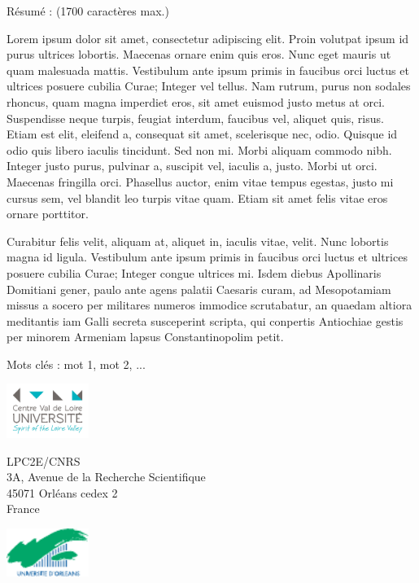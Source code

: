 {\begin{framed}
	\begin{minipage}{\dimexpr\textwidth-2\fboxrule-2\fboxsep}
	R\'esum\'e : (1700 caract\`eres max.)\par
	Lorem ipsum dolor sit amet, consectetur adipiscing elit. Proin volutpat ipsum id purus ultrices lobortis. Maecenas ornare enim quis eros. Nunc eget mauris ut quam malesuada mattis. Vestibulum ante ipsum primis in faucibus orci luctus et ultrices posuere cubilia Curae; Integer vel tellus. Nam rutrum, purus non sodales rhoncus, quam magna imperdiet eros, sit amet euismod justo metus at orci. Suspendisse neque turpis, feugiat interdum, faucibus vel, aliquet quis, risus. Etiam est elit, eleifend a, consequat sit amet, scelerisque nec, odio. Quisque id odio quis libero iaculis tincidunt. Sed non mi. Morbi aliquam commodo nibh. Integer justo purus, pulvinar a, suscipit vel, iaculis a, justo. Morbi ut orci. Maecenas fringilla orci. Phasellus auctor, enim vitae tempus egestas, justo mi cursus sem, vel blandit leo turpis vitae quam. Etiam sit amet felis vitae eros ornare porttitor.\par
	Curabitur felis velit, aliquam at, aliquet in, iaculis vitae, velit. Nunc lobortis magna id ligula. Vestibulum ante ipsum primis in faucibus orci luctus et ultrices posuere cubilia Curae; Integer congue ultrices mi.
	Isdem diebus Apollinaris Domitiani gener, paulo ante agens palatii Caesaris curam, ad Mesopotamiam missus a socero per militares numeros immodice scrutabatur, an quaedam altiora meditantis iam Galli secreta susceperint scripta, qui conpertis Antiochiae gestis per minorem Armeniam lapsus Constantinopolim petit.\par
Mots cl\'es : mot 1, mot 2, ...
	\end{minipage}
\end{framed}

\includegraphics[width=0.2\textwidth, valign=c]{./images/logos/pucvl}
\hfill
\begin{minipage}{.5\textwidth}
\begin{center}
LPC2E/CNRS\\
3A, Avenue de la Recherche Scientifique\\
45071 Orléans cedex 2\\
France \\
\end{center}
\end{minipage}
\hfill
\includegraphics[width=0.2\textwidth, valign=c]{./images/logos/univ}

}